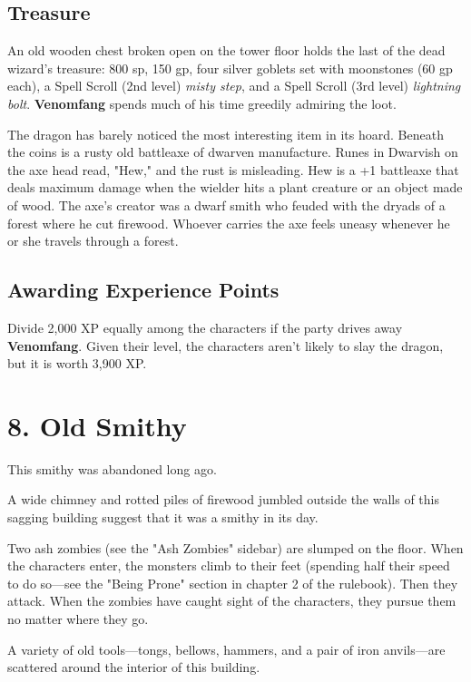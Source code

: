 \documentclass[10pt,a4paper,twoside,bg=print,twocolumn,openany,nodeprecatedcode]{dndbook}
\begin{document}
\subsection{Treasure}
An old wooden chest broken open on the tower floor holds the last of the dead wizard's treasure: 800 sp, 150 gp, four silver goblets set with moonstones (60 gp each), a Spell Scroll (2nd level) \textit{misty step}, and a Spell Scroll (3rd level) \textit{lightning bolt}. \textbf{Venomfang} spends much of his time greedily admiring the loot.

The dragon has barely noticed the most interesting item in its hoard. Beneath the coins is a rusty old battleaxe of dwarven manufacture. Runes in Dwarvish on the axe head read, "Hew," and the rust is misleading. Hew is a +1 battleaxe that deals maximum damage when the wielder hits a plant creature or an object made of wood. The axe's creator was a dwarf smith who feuded with the dryads of a forest where he cut firewood. Whoever carries the axe feels uneasy whenever he or she travels through a forest.

\subsection{Awarding Experience Points}
Divide 2,000 XP equally among the characters if the party drives away \textbf{Venomfang}. Given their level, the characters aren't likely to slay the dragon, but it is worth 3,900 XP.

\section{8. Old Smithy}
This smithy was abandoned long ago.

\begin{DndReadAloud}{}
A wide chimney and rotted piles of firewood jumbled outside the walls of this sagging building suggest that it was a smithy in its day.

\end{DndReadAloud}

Two ash zombies (see the "Ash Zombies" sidebar) are slumped on the floor. When the characters enter, the monsters climb to their feet (spending half their speed to do so—see the "Being Prone" section in chapter 2 of the rulebook). Then they attack. When the zombies have caught sight of the characters, they pursue them no matter where they go.

A variety of old tools—tongs, bellows, hammers, and a pair of iron anvils—are scattered around the interior of this building.
\end{document}
